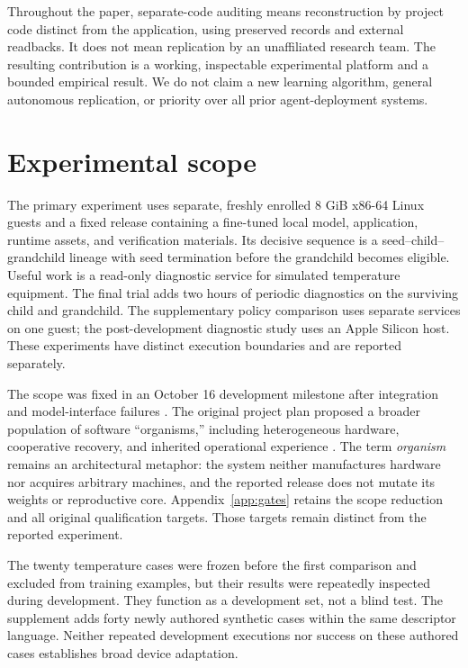 \documentclass[11pt,letterpaper]{article}
\begin{document}
Throughout the paper, separate-code auditing means reconstruction by project
code distinct from the application, using preserved records and external
readbacks. It does not mean replication by an unaffiliated research team.
The resulting contribution is a working, inspectable experimental platform and
a bounded empirical result. We do not claim a new learning algorithm, general
autonomous replication, or priority over all prior agent-deployment systems.

\section{Experimental scope}
\label{sec:scope}

The primary experiment uses separate, freshly enrolled 8 GiB x86-64 Linux
guests and a fixed release containing a fine-tuned local model, application,
runtime assets, and verification materials. Its decisive sequence is a
seed--child--grandchild lineage with seed termination before the grandchild
becomes eligible. Useful work is a read-only diagnostic service for simulated
temperature equipment. The final trial adds two hours of periodic diagnostics
on the surviving child and grandchild. The supplementary policy comparison
uses separate services on one guest; the post-development diagnostic study
uses an Apple Silicon host. These experiments have distinct execution
boundaries and are reported separately.

The scope was fixed in an October 16 development milestone after integration
and model-interface failures \cite{reduced}. The original project plan proposed
a broader population of software ``organisms,'' including heterogeneous
hardware, cooperative recovery, and inherited operational experience
\cite{original}. The term \emph{organism} remains an architectural metaphor:
the system neither manufactures hardware nor acquires arbitrary machines, and
the reported release does not mutate its weights or reproductive core.
Appendix~\ref{app:gates} retains the scope reduction and all original
qualification targets. Those targets remain distinct from the reported
experiment.

The twenty temperature cases were frozen before the first comparison and
excluded from training examples, but their results were repeatedly inspected
during development. They function as a development set, not a blind test.
The supplement adds forty newly authored synthetic cases within the same
descriptor language. Neither repeated development executions nor success on
these authored cases establishes broad device adaptation.
\end{document}
